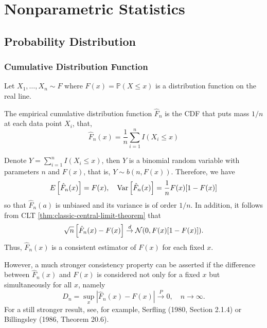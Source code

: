 \chapter{Nonparametric Statistics}

\section{Probability Distribution}

\subsection{Cumulative Distribution Function}

Let $X_{1},\ldots,X_{n}\sim F$ where $F(x)=\mathbb{P}(X\leq x)$ is a distribution function on the real line.

\begin{definition}
	The empirical cumulative distribution function $\widehat{F}_{n}$ is the CDF that puts mass $1/n$ at each data point $X_{i}$, that,
	\begin{equation}
		\widehat{F}_{n}(x)=\frac{1}{n}\sum_{i=1}^{n}I\left(X_{i}\leq x\right)
	\end{equation}
\end{definition}

Denote $Y=\sum_{i=1}^{n}I\left(X_{i}\leq x\right)$, then $Y$ is a binomial random variable with parameters $n$ and $F(x)$, that is, $Y\sim b(n,F(x))$. Therefore, we have
\begin{equation*}
	E\left[\hat{F}_{n}(x)\right]=F(x),\quad\mathrm{Var}\left[\hat{F}_{n}(x)\right]=\frac{1}{n}F(x)[1-F(x)]
\end{equation*}
so that $\hat{F}_{n}(a)$ is unbiased and its variance is of order $1/n$. In addition, it follows from CLT \eqref{thm:classic-central-limit-theorem} that
\begin{equation*}
	\sqrt{n}\left[\hat{F}_{n}(x)-F(x)\right]\stackrel{d}{\rightarrow}{\mathcal N}(0,F(x)[1-F(x)]).
\end{equation*}
Thus, $\hat{F}_{n}(x)$ is a consistent estimator of $F(x)$ for each fixed $x$.

However, a much stronger consistency property can be asserted if the difference between $\hat{F}_{n}(x)$ and $F(x)$ is considered not only for a fixed $x$ but simultaneously for all $x$, namely
\begin{equation*}
	D_{n}=\sup _x\left|\hat{F}_{n}(x)-F(x)\right| \xrightarrow{P} 0,\quad n \rightarrow \infty.
\end{equation*}
For a still stronger result, see, for example, Serfling (1980, Section 2.1.4) or Billingsley (1986, Theorem 20.6).

